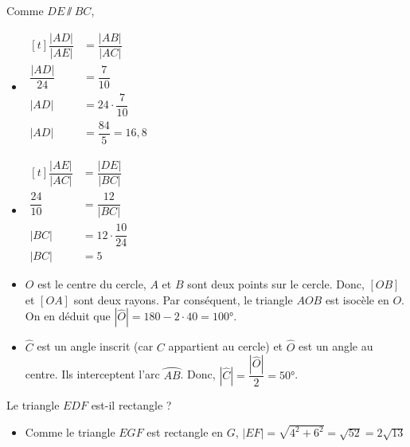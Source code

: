 \documentclass[a4paper, 12pt, parskip=half-, twoside=semi]{scrartcl}
\begin{document}
\begin{solution}
\begin{tasks}
        \task
        Comme $DE \sslash BC$,
        \begin{itemize}
            \item
                  $
                      \begin{aligned}[t]
                          \dfrac{|AD|}{|AE|} & = \dfrac{|AB|}{|AC|}     \\
                          \dfrac{|AD|}{24}   & = \dfrac{7}{10}          \\
                          |AD|               & = 24 \cdot \dfrac{7}{10} \\
                          |AD|               & = \dfrac{84}{5} = 16,8
                      \end{aligned}
                  $

            \item
                  $
                      \begin{aligned}[t]
                          \dfrac{|AE|}{|AC|} & = \dfrac{|DE|}{|BC|}      \\
                          \dfrac{24}{10}     & = \dfrac{12}{|BC|}        \\
                          |BC|               & = 12 \cdot \dfrac{10}{24} \\
                          |BC|               & = 5
                      \end{aligned}
                  $
        \end{itemize}

        \task
        \begin{itemize}
            \item
                  $O$ est le centre du cercle, $A$ et $B$ sont deux points sur le cercle. Donc, $[OB]$ et $[OA]$ sont deux rayons. Par conséquent, le triangle $AOB$ est isocèle en $O$. On en déduit que $|\widehat{O}| = 180-2\cdot 40 = \ang{100}$.

            \item
                  $\widehat{C}$ est un angle inscrit (car $C$ appartient au cercle) et $\widehat{O}$ est un angle au centre. Ils interceptent l'arc $\wideparen{AB}$. Donc, $|\widehat{C}| = \dfrac{|\widehat{O}|}{2}=\ang{50}$.
        \end{itemize}
    \end{tasks}
\end{solution}

\begin{appliquer}[points=2]
    Le triangle $EDF$ est-il rectangle ?
    \begin{center}
        
    \end{center}
\end{appliquer}
\begin{solution}
    \begin{itemize}
        \item
              Comme le triangle $EGF$ est rectangle en $G$, $|EF| = \sqrt{4^2 + 6^2} = \sqrt{52} = 2\sqrt{13}$
    \end{itemize}
\end{solution}
\end{document}
